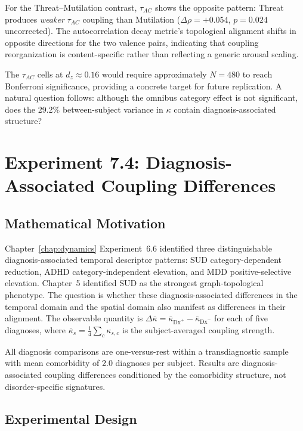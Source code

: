 For the Threat--Mutilation contrast, $\tau_{AC}$ shows the opposite pattern: Threat produces \emph{weaker} $\tau_{AC}$ coupling than Mutilation ($\Delta\rho = +0.054$, $p = 0.024$ uncorrected). The autocorrelation decay metric's topological alignment shifts in opposite directions for the two valence pairs, indicating that coupling reorganization is content-specific rather than reflecting a generic arousal scaling.

The $\tau_{AC}$ cells at $d_z \approx 0.16$ would require approximately $N = 480$ to reach Bonferroni significance, providing a concrete target for future replication. A natural question follows: although the omnibus category effect is not significant, does the 29.2\% between-subject variance in $\kappa$ contain diagnosis-associated structure?


\section{Experiment 7.4: Diagnosis-Associated Coupling Differences}
\label{sec:exp7_diagnosis}

\subsection{Mathematical Motivation}

Chapter~\ref{chap:dynamics} Experiment~6.6 identified three distinguishable diagnosis-associated temporal descriptor patterns: SUD category-dependent reduction, ADHD category-independent elevation, and MDD positive-selective elevation. Chapter~5 identified SUD as the strongest graph-topological phenotype. The question is whether these diagnosis-associated differences in the temporal domain and the spatial domain also manifest as differences in their alignment. The observable quantity is $\Delta\bar{\kappa} = \bar{\kappa}_{\text{Dx}^+} - \bar{\kappa}_{\text{Dx}^-}$ for each of five diagnoses, where $\bar{\kappa}_s = \frac{1}{4}\sum_c \kappa_{s,c}$ is the subject-averaged coupling strength.

All diagnosis comparisons are one-versus-rest within a transdiagnostic sample with mean comorbidity of 2.0 diagnoses per subject. Results are diagnosis-associated coupling differences conditioned by the comorbidity structure, not disorder-specific signatures.

\subsection{Experimental Design}

